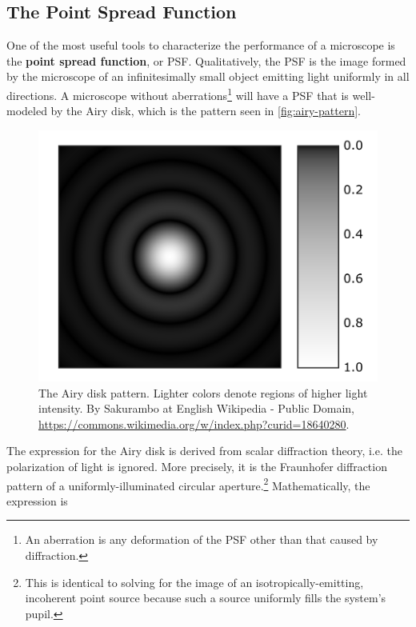 \documentclass[10pt,a4paper]{book}
\begin{document}
\subsection{The Point Spread Function}

One of the most useful tools to characterize the performance of a microscope is the \textbf{point spread function}, or PSF. Qualitatively, the PSF is the image formed by the microscope of an infinitesimally small object emitting light uniformly in all directions. A microscope without aberrations\footnote{An aberration is any deformation of the PSF other than that caused by diffraction.} will have a PSF that is well-modeled by the Airy disk, which is the pattern seen in \autoref{fig:airy-pattern}.

\begin{figure}[ht]
    \centering
    \includegraphics{Airy-pattern.png}
    \caption{The Airy disk pattern. Lighter colors denote regions of higher light intensity. By Sakurambo at English Wikipedia - Public Domain, \url{https://commons.wikimedia.org/w/index.php?curid=18640280}.}
    \label{fig:airy-pattern}
\end{figure}

The expression for the Airy disk is derived from scalar diffraction theory, i.e. the polarization of light is ignored. More precisely, it is the Fraunhofer diffraction pattern of a uniformly-illuminated circular aperture.\footnote{This is identical to solving for the image of an isotropically-emitting, incoherent point source because such a source uniformly fills the system's pupil.} Mathematically, the expression is
\end{document}

